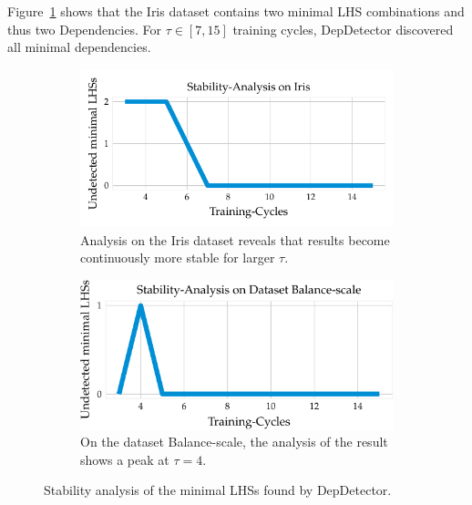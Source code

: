 Figure~\ref{fig:dep_detector_lhs_stability_iris} shows that the Iris dataset contains two minimal LHS combinations and thus two Dependencies.
For \( \tau \in [7, 15] \) training cycles, DepDetector discovered all minimal dependencies.
\begin{figure}[ht]
     \centering
     \begin{subfigure}[b]{0.45\textwidth}
         \centering
         \includegraphics[width=\textwidth]{../figures/iris/iris_dep_detector_lhs_stability}
         \caption{Analysis on the Iris dataset reveals that results become continuously more stable for larger \( \tau \).}
         \label{fig:dep_detector_lhs_stability_iris}
     \end{subfigure}
     \hfill
     \begin{subfigure}[b]{0.45\textwidth}
         \centering
         \includegraphics[width=\textwidth]{../figures/balance-scale/balance_scale_dep_detector_lhs_stability.pdf}
         \caption{On the dataset Balance-scale, the analysis of the result shows a peak at \( \tau = 4 \).}
         \label{fig:dep_detector_lhs_stability_balance_scale}
     \end{subfigure}
        \caption{Stability analysis of the minimal LHSs found by DepDetector.}
        \label{fig:stabilit_analysis}
\end{figure}

